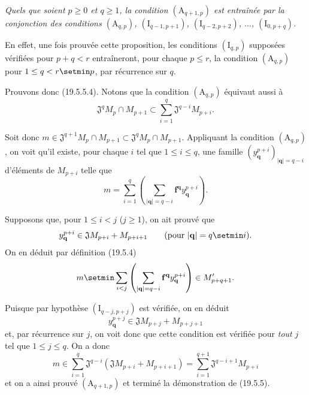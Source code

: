\begin{env}[19.5.5.4]
\label{IV.19.5.5.4}
\emph{Quels que soient $p\geq0$ et $q\geq1$, la condition $(\mathrm A_{q+1,p})$ est entraînée par la conjonction des conditions $(\mathrm A_{q,p})$, $(\mathrm I_{q-1,p+1})$, $(\mathrm I_{q-2,p+2})$, $\ldots$, $(\mathrm I_{0,p+q})$.}

En effet, une fois prouvée cette proposition, les conditions $(\mathrm I_{q,p})$ supposées vérifiées pour $p+q<r$ entraîneront, pour chaque $p\leq r$, la condition $(\mathrm A_{q,p})$ pour $1\leq q<r\setmin p$, par récurrence sur $q$.

Prouvons donc (19.5.5.4). Notons que la condition $(\mathrm A_{q,p})$ équivaut aussi à
\begin{equation}
  \mathfrak J^qM_p\cap M_{p+1}\subset\sum_{i=1}^q\mathfrak J^{q-i}M_{p+i}.
  \tag{19.5.5.5}\label{IV.19.5.5.5}
\end{equation}

Soit donc $m\in\mathfrak J^{q+1}M_p\cap M_{p+1}\subset\mathfrak J^qM_p\cap M_{p+1}$. Appliquant la condition $(\mathrm A_{q,p})$, on voit qu'il existe, pour chaque $i$ tel que $1\leq i\leq q$, une famille $(y_{\mathbf q}^{p+i})_{|\mathbf q|=q-i}$ d'éléments de $M_{p+i}$ telle que
\[
  m=\sum_{i=1}^q\left(\sum_{|\mathbf q|=q-i}\mathbf f^{\mathbf q}y_{\mathbf q}^{p+i}\right).
\]

Supposons que, pour $1\leq i<j$ ($j\geq1$), on ait prouvé que
\[
  y_{\mathbf q}^{p+i}\in\mathfrak JM_{p+i}+M_{p+i+1}\qquad(\text{pour }|\mathbf q|=q\setmin i).
\]
On en déduit par définition (19.5.4)
\[
  m\setmin\sum_{i<j}\left(\sum_{|\mathbf q|=q-i}\mathbf f^{\mathbf q}y_{\mathbf q}^{p+i}\right)\in M_{p+q+1}'.
\]

Puisque par hypothèse $(\mathrm I_{q-j,p+j})$ est vérifiée, on en déduit
\[
  y_{\mathbf q}^{p+j}\in\mathfrak JM_{p+j}+M_{p+j+1}
\]
et, par récurrence sur $j$, on voit donc que cette condition est vérifiée pour \emph{tout} $j$ tel que $1\leq j\leq q$. On a donc
\[
  m\in\sum_{i=1}^q\mathfrak J^{q-i}(\mathfrak JM_{p+i}+M_{p+i+1})=\sum_{i=1}^{q+1}\mathfrak J^{q-i+1}M_{p+i}
\]
et on a ainsi prouvé $(\mathrm A_{q+1,p})$ et terminé la démonstration de (19.5.5).
\end{env}

